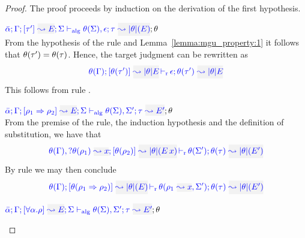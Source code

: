 \begin{proof}
The proof proceeds by induction on the derivation of the first hypothesis.
\begin{description}
\setlength{\itemsep}{1em}
\item[\fbox{\rref{Alg-M-Simp}}]\quad
$\admress{\bar\alpha}{\tenv}{\type'}{E}{\Sigma}{\type}{\etrans\theta(E)}{\theta(\Sigma),\epsilon}{\theta}$\ \\

From the hypothesis of the rule and Lemma~\ref{lemma:mgu_property:1} it follows that
$\theta(\tau') = \theta(\tau)$. Hence, the target judgment can be rewritten as
\begin{equation*}
  \dmres{\theta(\tenv)}{\theta(\type')}{\etrans\theta{E}}{\theta(\type')}{\etrans\theta{E}}{\epsilon}
\end{equation*}
This follows from rule .

\item[\fbox{\rref{Alg-M-IApp}}]\quad
$\admress{\bar\alpha}{\tenv}{\rulet_1\To\rulet_2}{E}{\Sigma}{\type}{E'}{\theta(\Sigma),\Sigma'}{\theta}$\ \\

  From the premise of the rule, the induction hypothesis and the definition of substitution,
we have that
\begin{equation*}
  \dmres{\theta(\tenv),\envi{\theta(\rulet_1)}{x}}{\theta(\rulet_2)}{\etrans\theta(\mmapp{E}{x})}{\theta(\type)}{\etrans{\theta}(E')}{\theta(\Sigma')}
\end{equation*}
  By rule  we may then conclude
\begin{equation*}
\dmres{\theta(\tenv)}{\theta(\rulet_1\To\rulet_2)}{\etrans\theta(E)}{\theta(\type)}{\etrans{\theta}(E')}{\theta(\ie{\rulet_1}{x},\Sigma')}
\end{equation*} 

\item[\fbox{\rref{Alg-M-TApp}}]\quad
$\admress{\bar\alpha}{\tenv}{\tall{\alpha}{\rulet}}{E}{\Sigma}{\type}{E'}{\theta(\Sigma),\Sigma'}{\theta}$\ \\


\end{description}
\end{proof}
